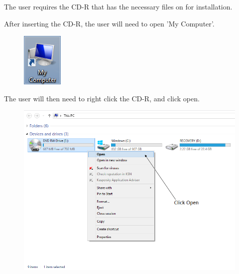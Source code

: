 The user requires the CD-R that has the necessary files on for installation. 


After inserting the CD-R, the user will need to open 'My Computer'.

\begin{figure}[H]
    \includegraphics[width=\textwidth]{./Manual/Installation/MyComputer.png}
\end{figure}

The user will then need to right click the CD-R, and click open.

\begin{figure}[H]
    \includegraphics[width=\textwidth]{./Manual/Installation/OpenCDR.png}
\end{figure}

